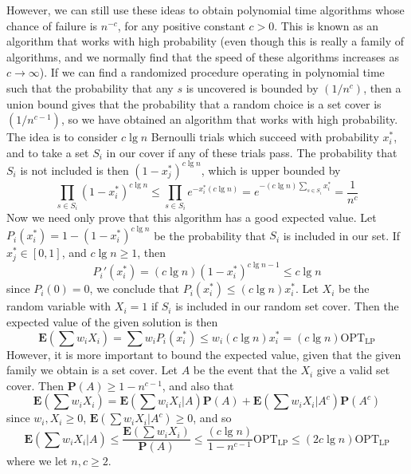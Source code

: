 However, we can still use these ideas to obtain polynomial time algorithms whose chance of failure is $n^{-c}$, for any positive constant $c > 0$. This is known as an algorithm that works with high probability (even though this is really a family of algorithms, and we normally find that the speed of these algorithms increases as $c \to \infty$). If we can find a randomized procedure operating in polynomial time such that the probability that any $s$ is uncovered is bounded by $(1/n^c)$, then a union bound gives that the probability that a random choice is a set cover is $(1/n^{c-1})$, so we have obtained an algorithm that works with high probability. The idea is to consider $c \lg n$ Bernoulli trials which succeed with probability $x^*_i$, and to take a set $S_i$ in our cover if any of these trials pass. The probability that $S_i$ is not included is then $(1 - x_j^*)^{c \lg n}$, which is upper bounded by
%
\[ \prod_{s \in S_i} (1 - x^*_i)^{c \lg n} \leq \prod_{s \in S_i} e^{-x_i^* (c \lg n)} = e^{- (c \lg n) \sum_{s \in S_i} x^*_i} = \frac{1}{n^c} \]
%
Now we need only prove that this algorithm has a good expected value. Let $P_i(x_i^*) = 1 - (1 - x_i^*)^{c \lg n}$ be the probability that $S_i$ is included in our set. If $x_j^* \in [0,1]$, and $c \lg n \geq 1$, then
%
\[ P_i'(x_i^*) = (c \lg n) (1 - x_i^*)^{c \lg n - 1} \leq c \lg n \]
%
since $P_i(0) = 0$, we conclude that $P_i(x_i^*) \leq (c \lg n) x_i^*$. Let $X_i$ be the random variable with $X_i = 1$ if $S_i$ is included in our random set cover. Then the expected value of the given solution is then
%
\[ \mathbf{E} \left(\sum w_i X_i \right) = \sum w_i P_i(x_i^*) \leq w_i (c \lg n) x_i^* = (c \lg n) \text{OPT}_{\text{LP}} \]
%
However, it is more important to bound the expected value, given that the given family we obtain is a set cover. Let $A$ be the event that the $X_i$ give a valid set cover. Then $\mathbf{P}(A) \geq 1 - n^{c-1}$, and also that
%
\[ \mathbf{E} \left(\sum w_i X_i \right) = \mathbf{E} \left(\sum w_i X_i | A \right) \mathbf{P}(A) + \mathbf{E} \left(\sum w_i X_i | A^c \right) \mathbf{P}(A^c) \]
%
since $w_i, X_i \geq 0$, $\mathbf{E}(\sum w_i X_i | A^c) \geq 0$, and so
%
\[ \mathbf{E} \left( \sum w_i X_i | A \right) \leq \frac{\mathbf{E} \left( \sum w_i X_i \right)}{\mathbf{P}(A)} \leq \frac{(c \lg n)}{1 - n^{c-1}} \text{OPT}_{\text{LP}} \leq (2 c \lg n) \text{OPT}_{\text{LP}} \]
%
where we let $n,c \geq 2$.

